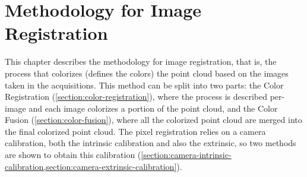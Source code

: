 \chapter{Methodology for Image Registration}
\label{section:methodology-for-image-registration}

This chapter describes the methodology for image registration, that is, the process that colorizes (defines the colors) the point cloud based on the images taken in the acquisitions. This method can be split into two parts: the Color Registration (\cref{section:color-registration}), where the process is described per-image and each image colorizes a portion of the point cloud, and the Color Fusion (\cref{section:color-fusion}), where all the colorized point cloud are merged into the final colorized point cloud. The pixel registration relies on a camera calibration, both the intrinsic calibration and also the extrinsic, so two methods are shown to obtain this calibration (\cref{section:camera-intrinsic-calibration,section:camera-extrinsic-calibration}).




